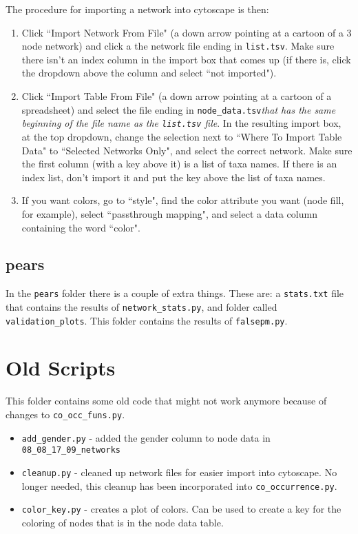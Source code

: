 \documentclass[10pt]{article}
\theoremstyle{definition}
\numberwithin{theorem}{section}
\numberwithin{definition}{section}
\numberwithin{lemma}{section}
\numberwithin{corollary}{section}
\numberwithin{clm}{section}
\numberwithin{rmk}{section}
\begin{document}
The procedure for importing a network into cytoscape is then:
\begin{enumerate}
	\item Click ``Import Network From File" (a down arrow pointing at a cartoon of a 3 node network) and click a the network file ending in \verb|list.tsv|. Make sure there isn't an index column in the import box that comes up (if there is, click the dropdown above the column and select ``not imported"). 
	\item Click ``Import Table From File" (a down arrow pointing at a cartoon of a spreadsheet) and select the file ending in \verb|node_data.tsv|\cprotect \emph{that has the same beginning of the file name as the \verb|list.tsv| file}. In the resulting import box, at the top dropdown, change the selection next to ``Where To Import Table Data" to ``Selected Networks Only", and select the correct network. Make sure the first column (with a key above it) is a list of taxa names. If there is an index list, don't import it and put the key above the list of taxa names.
	\item If you want colors, go to ``style", find the color attribute you want (node fill, for example), select ``passthrough mapping", and select a data column containing the word ``color".
\end{enumerate}

\subsection{pears}
In the \verb|pears| folder there is a couple of extra things. These are: a \verb|stats.txt| file that contains the results of \verb|network_stats.py|, and folder called \verb|validation_plots|. This folder contains the results of \verb|falsepm.py|.

\section{Old Scripts}
This folder contains some old code that might not work anymore because of changes to \verb|co_occ_funs.py|. 
\begin{itemize}
	\item \verb|add_gender.py| - added the gender column to node data in \verb|08_08_17_09_networks| 
	\item \verb|cleanup.py| - cleaned up network files for easier import into cytoscape. No longer needed, this cleanup has been incorporated into \verb|co_occurrence.py|.
	\item \verb|color_key.py| - creates a plot of colors. Can be used to create a key for the coloring of nodes that is in the node data table.
\end{itemize}
\end{document}
